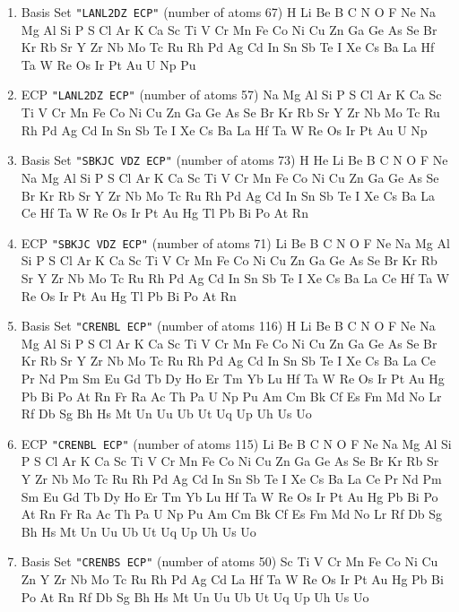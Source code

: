 \begin{enumerate}
\item Basis Set \verb#"LANL2DZ ECP"# (number of atoms 67)  \newline 
  H Li Be B C N O F Ne Na Mg Al Si P S Cl Ar K Ca Sc Ti V Cr Mn Fe
 Co Ni Cu Zn Ga Ge As Se Br Kr Rb Sr Y Zr Nb Mo Tc Ru Rh Pd Ag Cd In Sn Sb
 Te I Xe Cs Ba La Hf Ta W Re Os Ir Pt Au U Np Pu


\item ECP \verb#"LANL2DZ ECP"# (number of atoms 57)  \newline 
  Na Mg Al Si P S Cl Ar K Ca Sc Ti V Cr Mn Fe Co Ni Cu Zn Ga Ge As Se Br
 Kr Rb Sr Y Zr Nb Mo Tc Ru Rh Pd Ag Cd In Sn Sb Te I Xe Cs Ba La Hf Ta W
 Re Os Ir Pt Au U Np


\item Basis Set \verb#"SBKJC VDZ ECP"# (number of atoms 73)  \newline 
  H He Li Be B C N O F Ne Na Mg Al Si P S Cl Ar K Ca Sc Ti V Cr Mn
 Fe Co Ni Cu Zn Ga Ge As Se Br Kr Rb Sr Y Zr Nb Mo Tc Ru Rh Pd Ag Cd In Sn
 Sb Te I Xe Cs Ba La Ce Hf Ta W Re Os Ir Pt Au Hg Tl Pb Bi Po At Rn


\item ECP \verb#"SBKJC VDZ ECP"# (number of atoms 71)  \newline 
  Li Be B C N O F Ne Na Mg Al Si P S Cl Ar K Ca Sc Ti V Cr Mn Fe Co
 Ni Cu Zn Ga Ge As Se Br Kr Rb Sr Y Zr Nb Mo Tc Ru Rh Pd Ag Cd In Sn Sb Te
 I Xe Cs Ba La Ce Hf Ta W Re Os Ir Pt Au Hg Tl Pb Bi Po At Rn


\item Basis Set \verb#"CRENBL ECP"# (number of atoms 116)  \newline 
  H Li Be B C N O F Ne Na Mg Al Si P S Cl Ar K Ca Sc Ti V Cr Mn Fe
 Co Ni Cu Zn Ga Ge As Se Br Kr Rb Sr Y Zr Nb Mo Tc Ru Rh Pd Ag Cd In Sn Sb
 Te I Xe Cs Ba La Ce Pr Nd Pm Sm Eu Gd Tb Dy Ho Er Tm Yb Lu Hf Ta W Re Os
 Ir Pt Au Hg Pb Bi Po At Rn Fr Ra Ac Th Pa U Np Pu Am Cm Bk Cf Es Fm Md No
 Lr Rf Db Sg Bh Hs Mt Un Uu Ub Ut Uq Up Uh Us Uo


\item ECP \verb#"CRENBL ECP"# (number of atoms 115)  \newline 
  Li Be B C N O F Ne Na Mg Al Si P S Cl Ar K Ca Sc Ti V Cr Mn Fe Co
 Ni Cu Zn Ga Ge As Se Br Kr Rb Sr Y Zr Nb Mo Tc Ru Rh Pd Ag Cd In Sn Sb Te
 I Xe Cs Ba La Ce Pr Nd Pm Sm Eu Gd Tb Dy Ho Er Tm Yb Lu Hf Ta W Re Os Ir
 Pt Au Hg Pb Bi Po At Rn Fr Ra Ac Th Pa U Np Pu Am Cm Bk Cf Es Fm Md No Lr
 Rf Db Sg Bh Hs Mt Un Uu Ub Ut Uq Up Uh Us Uo


\item Basis Set \verb#"CRENBS ECP"# (number of atoms 50)  \newline 
  Sc Ti V Cr Mn Fe Co Ni Cu Zn Y Zr Nb Mo Tc Ru Rh Pd Ag Cd La Hf Ta W Re
 Os Ir Pt Au Hg Pb Bi Po At Rn Rf Db Sg Bh Hs Mt Un Uu Ub Ut Uq Up Uh Us Uo




\end{enumerate}
